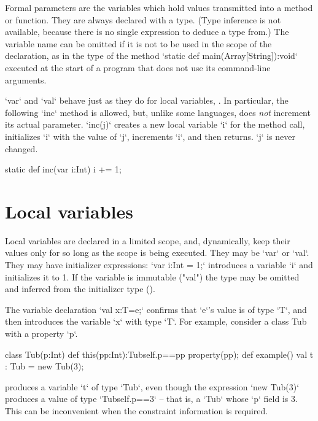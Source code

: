 Formal parameters are the variables which hold values transmitted into a
method or function.  
They are always declared with a type.  (Type inference is not
available, because there is no single expression to deduce a type from.)
The variable name can be omitted if it is not to be used in the
scope of the declaration, as in the type of the method 
\xcd`static def main(Array[String]):void` executed at the start of a program that
does not use its command-line arguments.

\xcd`var` and \xcd`val` behave just as they do for local
variables, .  In particular, the following \xcd`inc`
method is allowed, but, unlike some languages, does {\em not} increment its
actual parameter.  \xcd`inc(j)` creates a new local 
variable \xcd`i` for the method call, initializes \xcd`i` with the value of
\xcd`j`, increments \xcd`i`, and then returns.  \xcd`j` is never changed.
\begin{xten}
static def inc(var i:Int) { i += 1; }
\end{xten}


\section{Local variables}\label{local-variables}
Local variables are declared in a limited scope, and, dynamically, keep their
values only for so long as the scope is being executed.  They may be \xcd`var`
or \xcd`val`.  
They may have 
initializer expressions: \xcd`var i:Int = 1;` introduces 
a variable \xcd`i` and initializes it to 1.
If the variable is immutable
(\xcd"val")
the type may be omitted and
inferred from the initializer type ().

The variable declaration \xcd`val x:T=e;` confirms that \xcd`e`'s value is of
type \xcd`T`, and then introduces the variable \xcd`x` with type \xcd`T`.  For
example, consider a class Tub with a property \xcd`p`.
\begin{xten}
class Tub(p:Int){
  def this(pp:Int):Tub{self.p==pp} {property(pp);}
  def example() {
    val t : Tub = new Tub(3);
  }
}
\end{xten}
%
\noindent
produces a variable \xcd`t` of type \xcd`Tub`, even though the expression
\xcd`new Tub(3)` produces a value of type \xcd`Tub{self.p==3}` -- that is, a
\xcd`Tub`  whose \xcd`p` field is 3.  This can be inconvenient when the
constraint information is required.

